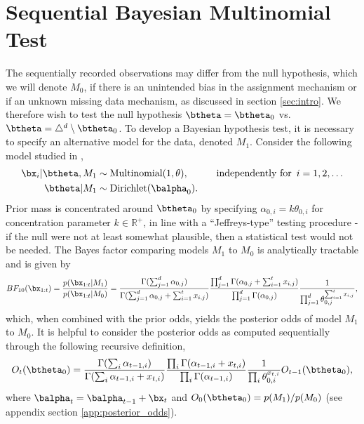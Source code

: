 \documentclass[11pt]{article}
\begin{document}
\section{Sequential Bayesian Multinomial Test}
\label{sec:srm_testing}
The sequentially recorded observations may differ from the null hypothesis, which we will denote $M_0$, if there is an unintended bias in the assignment mechanism or if an unknown missing data mechanism, as discussed in section \ref{sec:intro}.
We therefore wish to test the null hypothesis $\btheta = \btheta_0$ vs.\ $\btheta = \triangle^d \setminus \btheta_0$.
To develop a Bayesian hypothesis test, it is necessary to specify an alternative model for the data, denoted $M_1$.
Consider the following model studied in \cite{good},
\begin{align}
    \bx_i | \btheta, M_1 &\sim \text{Multinomial}(1,\theta), \hspace{1cm} \text{independently for }\, i=1,2,\dots\\
  \btheta | M_1 &\sim \text{Dirichlet}(\balpha_0).\notag
\end{align}
Prior mass is concentrated around $\btheta_0$ by specifying $\alpha_{0,i} = k \theta_{0,i}$ for concentration parameter $k \in \mathbb{R}^+$, in line with a ``Jeffreys-type'' testing procedure - if the null were not at least somewhat plausible, then a statistical test would not be needed.
The Bayes factor comparing models $M_1$ to $M_0$ is analytically tractable and is given by
\begin{equation}
  \label{eq:bayes_factor}
 BF_{10}(\bx_{1:t}) = \frac{p(\bx_{1:t}|M_1)}{p(\bx_{1:t}|M_0)} = \frac{\Gamma(\sum_{j=1}^{d} \alpha_{0,j})}{\Gamma(\sum_{j=1}^{d} \alpha_{0,j} + \sum_{i=1}^{t}x_{i,j})}\frac{\prod_{j=1}^{d}\Gamma(\alpha_{0,j} + \sum_{i=1}^{t}x_{i,j} )}{\prod_{j=1}^{d}\Gamma(\alpha_{0,j} )}\frac{1}{\prod_{j=1}^{d} \theta_{0,j}^{\sum_{i=1}^{t}x_{i,j}}},
\end{equation}
which, when combined with the prior odds, yields the posterior odds of model $M_1$ to $M_0$.
It is helpful to consider the posterior odds as computed sequentially through the following recursive definition,
\begin{equation}
  \label{eq:update_rule}
  O_{t}(\btheta_0) = \frac{\Gamma(\sum_i \alpha_{t-1,i})}{\Gamma(\sum_i \alpha_{t-1,i} +  x_{t,i})} \frac{\prod_i \Gamma(\alpha_{t-1,i} + x_{t,i})}{\prod_i \Gamma(\alpha_{t-1,i})} \frac{1}{\prod_i \theta_{0,i}^{x_{t,i}}}  O_{t-1}(\btheta_0),
\end{equation}
where $\balpha_t = \balpha_{t-1}+\bx_t$ and $O_0(\btheta_0)=p(M_1)/p(M_0)$ (see appendix section \ref{app:posterior_odds}).
\end{document}
